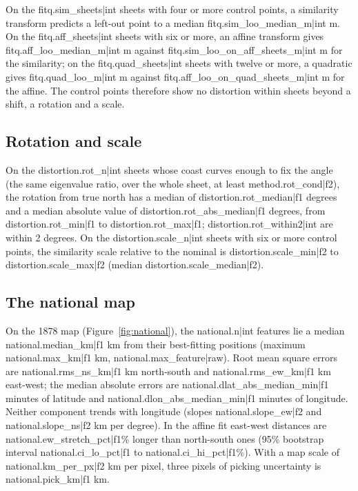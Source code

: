 \documentclass[11pt,a4paper]{article}
\begin{document}
On the {{fitq.sim_sheets|int}} sheets with four or more control points, a similarity transform predicts a left-out point to a median {{fitq.sim_loo_median_m|int}} m. On the {{fitq.aff_sheets|int}} sheets with six or more, an affine transform gives {{fitq.aff_loo_median_m|int}} m against {{fitq.sim_loo_on_aff_sheets_m|int}} m for the similarity; on the {{fitq.quad_sheets|int}} sheets with twelve or more, a quadratic gives {{fitq.quad_loo_m|int}} m against {{fitq.aff_loo_on_quad_sheets_m|int}} m for the affine. The control points therefore show no distortion within sheets beyond a shift, a rotation and a scale.

\subsection{Rotation and scale}
On the {{distortion.rot_n|int}} sheets whose coast curves enough to fix the angle (the same eigenvalue ratio, over the whole sheet, at least {{method.rot_cond|f2}}), the rotation from true north has a median of {{distortion.rot_median|f1}} degrees and a median absolute value of {{distortion.rot_abs_median|f1}} degrees, from {{distortion.rot_min|f1}} to {{distortion.rot_max|f1}}; {{distortion.rot_within2|int}} are within 2 degrees. On the {{distortion.scale_n|int}} sheets with six or more control points, the similarity scale relative to the nominal is {{distortion.scale_min|f2}} to {{distortion.scale_max|f2}} (median {{distortion.scale_median|f2}}).

\subsection{The national map}
On the 1878 map (Figure~\ref{fig:national}), the {{national.n|int}} features lie a median {{national.median_km|f1}} km from their best-fitting positions (maximum {{national.max_km|f1}} km, {{national.max_feature|raw}}). Root mean square errors are {{national.rms_ns_km|f1}} km north-south and {{national.rms_ew_km|f1}} km east-west; the median absolute errors are {{national.dlat_abs_median_min|f1}} minutes of latitude and {{national.dlon_abs_median_min|f1}} minutes of longitude. Neither component trends with longitude (slopes {{national.slope_ew|f2}} and {{national.slope_ns|f2}} km per degree). In the affine fit east-west distances are {{national.ew_stretch_pct|f1}}\% longer than north-south ones (95\% bootstrap interval {{national.ci_lo_pct|f1}} to {{national.ci_hi_pct|f1}}\%). With a map scale of {{national.km_per_px|f2}} km per pixel, three pixels of picking uncertainty is {{national.pick_km|f1}} km.
\end{document}
